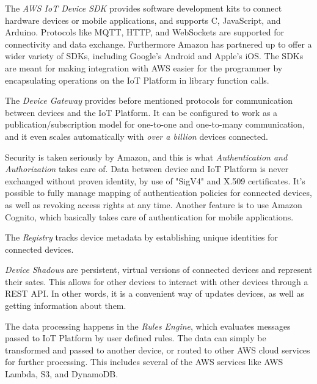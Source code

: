 The \textit{AWS IoT Device SDK} provides software development kits to connect hardware devices or mobile applications, and supports C, JavaScript, and Arduino. Protocols like MQTT, HTTP, and WebSockets are supported for connectivity and data exchange. Furthermore Amazon has partnered up to offer a wider variety of SDKs, including Google's Android and Apple's iOS. The SDKs are meant for making integration with AWS easier for the programmer by encapsulating operations on the IoT Platform in library function calls. 

The \textit{Device Gateway} provides before mentioned protocols for communication between devices and the IoT Platform. It can be configured to work as a publication/subscription model for one-to-one and one-to-many communication, and it even scales automatically with \textit{over a billion} devices connected.

Security is taken seriously by Amazon, and this is what \textit{Authentication and Authorization} takes care of. Data between device and IoT Platform is never exchanged without proven identity, by use of "SigV4" and X.509 certificates. It's possible to fully manage mapping of authentication policies for connected devices, as well as revoking access rights at any time. Another feature is to use Amazon Cognito, which basically takes care of authentication for mobile applications.

The \textit{Registry} tracks device metadata by establishing unique identities for connected devices. 

\textit{Device Shadows} are persistent, virtual versions of connected devices and represent their sates. This allows for other devices to interact with other devices through a REST API. In other words, it is a convenient way of updates devices, as well as getting information about them. 

The data processing happens in the \textit{Rules Engine}, which evaluates messages passed to IoT Platform by user defined rules. The data can simply be transformed and passed to another device, or routed to other AWS cloud services for further processing. This includes several of the AWS services like AWS Lambda, S3, and DynamoDB. \\

